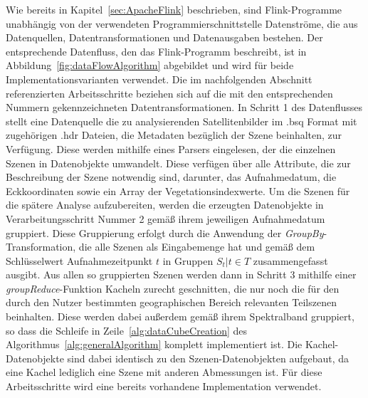 Wie bereits in Kapitel~\ref{sec:ApacheFlink} beschrieben, sind Flink-Programme unabhängig von der verwendeten Programmierschnittstelle Datenströme, die aus Datenquellen, Datentransformationen und Datenausgaben bestehen. Der entsprechende Datenfluss, den das Flink-Programm beschreibt, ist in Abbildung~\ref{fig:dataFlowAlgorithm} abgebildet und wird für beide Implementationsvarianten verwendet. Die im nachfolgenden Abschnitt referenzierten Arbeitsschritte beziehen sich auf die mit den entsprechenden Nummern gekennzeichneten Datentransformationen. In Schritt 1 des Datenflusses stellt eine Datenquelle die zu analysierenden Satellitenbilder im .bsq Format mit zugehörigen .hdr Dateien, die Metadaten bezüglich der Szene beinhalten, zur Verfügung. Diese werden mithilfe eines Parsers eingelesen, der die einzelnen Szenen in Datenobjekte umwandelt. Diese verfügen über alle Attribute, die zur Beschreibung der Szene notwendig sind, darunter, das Aufnahmedatum, die Eckkoordinaten sowie ein Array der Vegetationsindexwerte. Um die Szenen für die spätere Analyse aufzubereiten, werden die erzeugten Datenobjekte in Verarbeitungsschritt Nummer 2 gemäß ihrem jeweiligen Aufnahmedatum gruppiert. Diese Gruppierung erfolgt durch die Anwendung der \textit{GroupBy}-Transformation, die alle Szenen als Eingabemenge hat und gemäß dem Schlüsselwert Aufnahmezeitpunkt $t$ in Gruppen $S_t | t \in T$ zusammengefasst ausgibt. Aus allen so gruppierten Szenen werden dann in Schritt 3 mithilfe einer \textit{groupReduce}-Funktion Kacheln zurecht geschnitten, die nur noch die für den durch den Nutzer bestimmten geographischen Bereich relevanten Teilszenen beinhalten. Diese werden dabei außerdem gemäß ihrem Spektralband gruppiert, so dass die Schleife in Zeile~\ref{alg:dataCubeCreation} des Algorithmus~\ref{alg:generalAlgorithm} komplett implementiert ist. Die Kachel-Datenobjekte sind dabei identisch zu den Szenen-Datenobjekten aufgebaut, da eine Kachel lediglich eine Szene mit anderen Abmessungen ist. Für diese Arbeitsschritte wird eine bereits vorhandene Implementation verwendet. 
